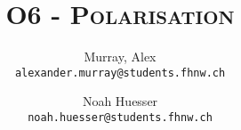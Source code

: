 \author{%
    Murray, Alex\\
    \texttt{alexander.murray@students.fhnw.ch}
    \and
    Noah Huesser\\
    \texttt{noah.huesser@students.fhnw.ch}
}

\title{
    \vspace{20mm}
    \Huge{\textsc{O6 - Polarisation}}
}
